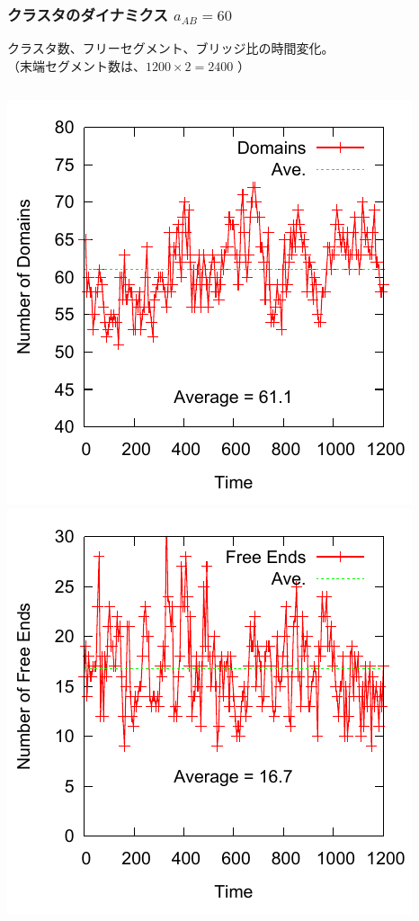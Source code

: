 \documentclass[12pt, dvipdfmx]{beamer}
\begin{document}
\begin{frame}
\frametitle{クラスタのダイナミクス $a_{AB}=60$}
クラスタ数、フリーセグメント、ブリッジ比の時間変化。\\
（末端セグメント数は、$1200\times2 = 2400$
）
\begin{columns}[T, totalwidth=\linewidth]
		\includegraphics[width=\columnwidth]{./fig/AB60/Domains.pdf}
		\includegraphics[width=\columnwidth]{./fig/AB60/Free_Ends.pdf}

\end{columns}
\end{frame}
\end{document}
